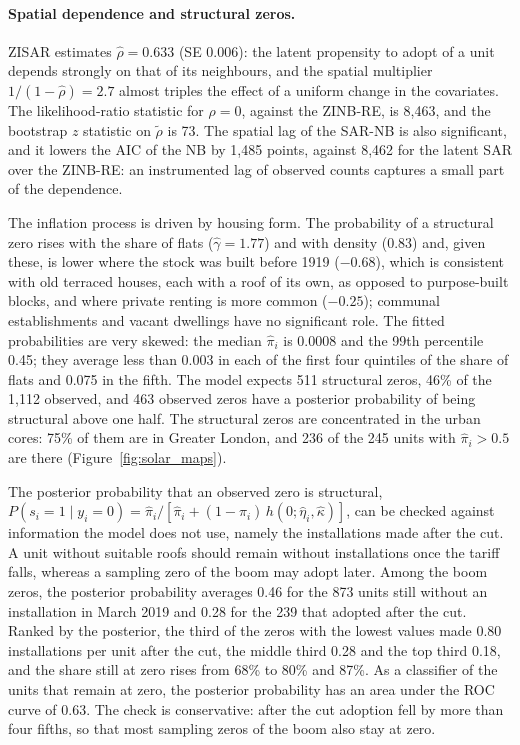 \paragraph{Spatial dependence and structural zeros.}
ZISAR estimates $\hat\rho = 0.633$ (SE 0.006): the latent propensity to adopt of a unit depends strongly on that of its neighbours, and the spatial multiplier $1/(1-\hat\rho) = 2.7$ almost triples the effect of a uniform change in the covariates.
The likelihood-ratio statistic for $\rho = 0$, against the ZINB-RE, is 8{,}463, and the bootstrap $z$ statistic on $\tilde\rho$ is 73.
The spatial lag of the SAR-NB is also significant, and it lowers the AIC of the NB by 1{,}485 points, against 8{,}462 for the latent SAR over the ZINB-RE: an instrumented lag of observed counts captures a small part of the dependence.

The inflation process is driven by housing form.
The probability of a structural zero rises with the share of flats ($\hat\gamma = 1.77$) and with density ($0.83$) and, given these, is lower where the stock was built before 1919 ($-0.68$), which is consistent with old terraced houses, each with a roof of its own, as opposed to purpose-built blocks, and where private renting is more common ($-0.25$); communal establishments and vacant dwellings have no significant role.
The fitted probabilities are very skewed: the median $\hat\pi_i$ is 0.0008 and the 99th percentile 0.45; they average less than 0.003 in each of the first four quintiles of the share of flats and 0.075 in the fifth.
The model expects 511 structural zeros, 46\% of the 1{,}112 observed, and 463 observed zeros have a posterior probability of being structural above one half.
The structural zeros are concentrated in the urban cores: 75\% of them are in Greater London, and 236 of the 245 units with $\hat\pi_i > 0.5$ are there (Figure~\ref{fig:solar_maps}).

The posterior probability that an observed zero is structural, $P(s_i = 1\mid y_i=0) = \hat\pi_i/[\hat\pi_i + (1-\hat\pi_i)\,h(0;\hat\eta_i,\hat\kappa)]$, can be checked against information the model does not use, namely the installations made after the cut.
A unit without suitable roofs should remain without installations once the tariff falls, whereas a sampling zero of the boom may adopt later.
Among the boom zeros, the posterior probability averages 0.46 for the 873 units still without an installation in March 2019 and 0.28 for the 239 that adopted after the cut.
Ranked by the posterior, the third of the zeros with the lowest values made 0.80 installations per unit after the cut, the middle third 0.28 and the top third 0.18, and the share still at zero rises from 68\% to 80\% and 87\%.
As a classifier of the units that remain at zero, the posterior probability has an area under the ROC curve of 0.63.
The check is conservative: after the cut adoption fell by more than four fifths, so that most sampling zeros of the boom also stay at zero.

